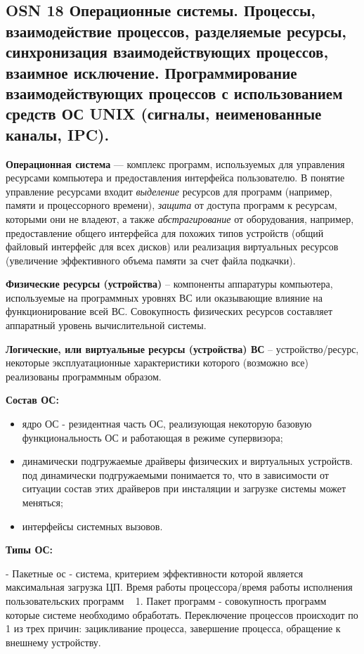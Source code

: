 \subsection*{OSN 18 Операционные системы. Процессы, взаимодействие процессов, разделяемые ресурсы, синхронизация взаимодействующих процессов, взаимное исключение. Программирование взаимодействующих процессов с использованием средств ОС UNIX (сигналы, неименованные каналы, IPC).}

\textbf{Операционная система} --- комплекс программ, используемых для управления ресурсами компьютера и предоставления интерфейса пользователю.
В понятие управление ресурсами входит \textit{выделение} ресурсов для программ (например, памяти и процессорного времени),
\textit{защита} от доступа программ к ресурсам, которыми они не владеют, а также
\textit{абстрагирование} от оборудования, например, предоставление общего интерфейса для похожих типов устройств
(общий файловый интерфейс для всех дисков) или реализация виртуальных ресурсов (увеличение эффективного объема памяти за счет файла подкачки).

\textbf{Физические ресурсы (устройства)} -- компоненты аппаратуры компьютера, используемые на программных уровнях ВС или оказывающие влияние на функционирование всей ВС. Совокупность физических ресурсов составляет аппаратный уровень вычислительной системы.

\textbf{Логические, или виртуальные ресурсы (устройства) ВС} -- устройство/ресурс, некоторые эксплуатационные характеристики которого (возможно все) реализованы программным образом.

\textbf{Состав ОС:} 
\begin{itemize}
    \item ядро ОС - резидентная часть ОС, реализующая некоторую базовую функциональность ОС и работающая в режиме супервизора;
    \item динамически подгружаемые драйверы физических и виртуальных устройств. под динамически подгружаемыми понимается то, что в зависимости от ситуации состав этих драйверов при инсталяции и загрузке системы может меняться;
    \item интерфейсы системных вызовов.
\end{itemize} 

\textbf{Типы ОС:} 

- Пакетные ос  - система, критерием эффективности которой является максимальная загрузка ЦП. Время работы процессора/время работы исполнения пользовательских программ ~ 1. Пакет программ - совокупность программ которые системе необходимо обработать. Переключение процессов происходит по 1 из трех причин: зацикливание процесса, завершение процесса, обращение к внешнему устройству. 

